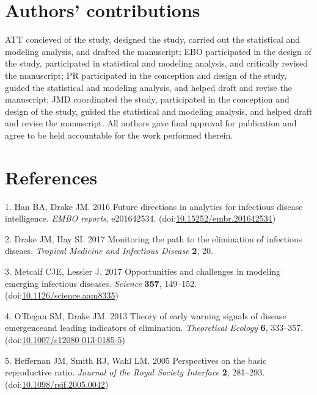 \documentclass[3p]{elsarticle} %
\begin{document}
\hypertarget{authors-contributions}{%
\section{Authors' contributions}\label{authors-contributions}}

ATT concieved of the study, designed the study, carried out the
statistical and modeling analysis, and drafted the manuscript; EBO
participated in the design of the study, participated in statistical and
modeling analysis, and critically revised the manuscript; PR
participated in the conception and design of the study, guided the
statistical and modeling analysis, and helped draft and revise the
manuscript; JMD coordinated the study, participated in the conception
and design of the study, guided the statistical and modeling analysis,
and helped draft and revise the manuscript. All authors gave final
approval for publication and agree to be held accountable for the work
performed therein.

\hypertarget{references}{%
\section*{References}\label{references}}

\hypertarget{refs}{}
\leavevmode\hypertarget{ref-Han2016}{}%
1. Han BA, Drake JM. 2016 Future directions in analytics for infectious
disease intelligence. \emph{EMBO reports}, e201642534.
(doi:\href{https://doi.org/10.15252/embr.201642534}{10.15252/embr.201642534})

\leavevmode\hypertarget{ref-Drake2017}{}%
2. Drake JM, Hay SI. 2017 Monitoring the path to the elimination of
infectious diseaes. \emph{Tropical Medicine and Infectious Disease}
\textbf{2}, 20.

\leavevmode\hypertarget{ref-Metcalf2017}{}%
3. Metcalf CJE, Lessler J. 2017 Opportunities and challenges in modeling
emerging infectious diseases. \emph{Science} \textbf{357}, 149--152.
(doi:\href{https://doi.org/10.1126/science.aam8335}{10.1126/science.aam8335})

\leavevmode\hypertarget{ref-ORegan2013}{}%
4. O'Regan SM, Drake JM. 2013 Theory of early warning signals of disease
emergenceand leading indicators of elimination. \emph{Theoretical
Ecology} \textbf{6}, 333--357.
(doi:\href{https://doi.org/10.1007/s12080-013-0185-5}{10.1007/s12080-013-0185-5})

\leavevmode\hypertarget{ref-Heffernan2005}{}%
5. Heffernan JM, Smith RJ, Wahl LM. 2005 Perspectives on the basic
reproductive ratio. \emph{Journal of the Royal Society Interface}
\textbf{2}, 281--293.
(doi:\href{https://doi.org/10.1098/rsif.2005.0042}{10.1098/rsif.2005.0042})
\end{document}
